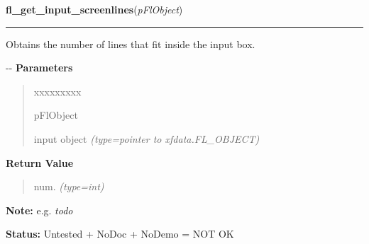 \hspace{.8\funcindent}\begin{boxedminipage}{\funcwidth}

    \raggedright \textbf{fl\_get\_input\_screenlines}(\textit{pFlObject})

    \vspace{-1.5ex}

    \rule{\textwidth}{0.5\fboxrule}
\setlength{\parskip}{2ex}

Obtains the number of lines that fit inside the input box.

-{}-
\setlength{\parskip}{1ex}
      \textbf{Parameters}
      \vspace{-1ex}

      \begin{quote}
        \begin{Ventry}{xxxxxxxxx}

          \item[pFlObject]


input object
            {\it (type=pointer to xfdata.FL\_OBJECT)}

        \end{Ventry}

      \end{quote}

      \textbf{Return Value}
    \vspace{-1ex}

      \begin{quote}

num.
      {\it (type=int)}

      \end{quote}

\textbf{Note:} 
e.g. \emph{todo}


\textbf{Status:} 
Untested + NoDoc + NoDemo = NOT OK


    \end{boxedminipage}

    \label{xformslib:flinput:fl_get_input_cursorpos}

    \vspace{0.5ex}

